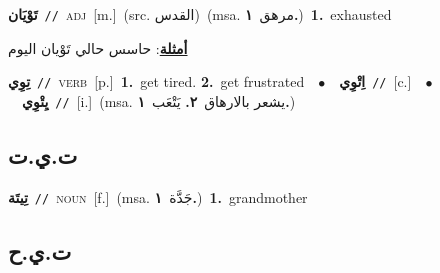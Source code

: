 \documentclass[10pt,a4paper,twoside]{article} %
\begin{document}
\begin{multicols}{2}
{\setlength\topsep{0pt}\textbf{\foreignlanguage{arabic}{تَوْيَان}}\ {\color{gray}\texttt{//}\color{black}}\ \textsc{adj}\ [m.]\ (src. \color{gray}\foreignlanguage{arabic}{القدس}\color{black})\ \color{gray}(msa. \foreignlanguage{arabic}{مرهق}~\foreignlanguage{arabic}{\textbf{١.}})\color{black}\ \textbf{1.}~exhausted\  \begin{flushright}\color{gray}\foreignlanguage{arabic}{\textbf{\underline{\foreignlanguage{arabic}{أمثلة}}}: حاسس حالي تَوْيان اليوم}\end{flushright}\color{black}} \vspace{2mm}

{\setlength\topsep{0pt}\textbf{\foreignlanguage{arabic}{تِوِي}}\ {\color{gray}\texttt{//}\color{black}}\ \textsc{verb}\ [p.]\ \textbf{1.}~get tired.  \textbf{2.}~get frustrated\ \ $\bullet$\ \ \setlength\topsep{0pt}\textbf{\foreignlanguage{arabic}{اِتْوِي}}\ {\color{gray}\texttt{//}\color{black}}\ [c.]\ \ $\bullet$\ \ \setlength\topsep{0pt}\textbf{\foreignlanguage{arabic}{يِتْوِي}}\ {\color{gray}\texttt{//}\color{black}}\ [i.]\ \color{gray}(msa. \foreignlanguage{arabic}{يشعر بالارهاق}~\foreignlanguage{arabic}{\textbf{٢.}}  \foreignlanguage{arabic}{يَتْعَب}~\foreignlanguage{arabic}{\textbf{١.}})\color{black}\ } \vspace{2mm}

\vspace{-3mm}
\subsection*{\color{blue}\foreignlanguage{arabic}{ت.ي.ت}\color{blue}{ (ntws)}} 

{\setlength\topsep{0pt}\textbf{\foreignlanguage{arabic}{تِيتَة}}\ {\color{gray}\texttt{//}\color{black}}\ \textsc{noun}\ [f.]\ \color{gray}(msa. \foreignlanguage{arabic}{جَدَّة}~\foreignlanguage{arabic}{\textbf{١.}})\color{black}\ \textbf{1.}~grandmother\ } \vspace{2mm}

\vspace{-3mm}
\subsection*{\color{blue}\foreignlanguage{arabic}{ت.ي.ح}\color{blue}{}} 


\end{multicols}
\end{document}
